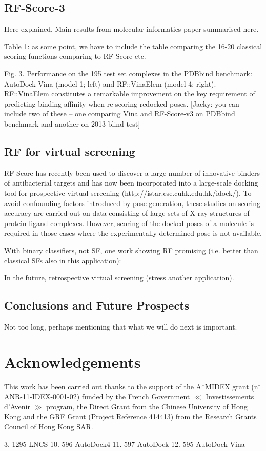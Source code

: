 \documentclass{llncs}
\begin{document}
\subsection{RF-Score-3}

Here explained. Main results from molecular informatics paper summarised here.

Table 1: as some point, we have to include the table comparing the 16-20 classical scoring functions comparing to RF-Score etc.

Fig. 3. Performance on the 195 test set complexes in the PDBbind benchmark: AutoDock Vina (model 1; left) and RF::VinaElem (model 4; right). RF::VinaElem constitutes a remarkable improvement on the key requirement of predicting binding affinity when re-scoring redocked poses. [Jacky: you can include two of these – one comparing Vina and RF-Score-v3 on PDBbind benchmark and another on 2013 blind test]

\subsection{RF for virtual screening}

RF-Score has recently been used \cite{1281} to discover a large number of innovative binders of antibacterial targets and has now been incorporated \cite{1362} into a large-scale docking tool for prospective virtual screening (http://istar.cse.cuhk.edu.hk/idock/). To avoid confounding factors introduced by pose generation, these studies on scoring accuracy are carried out on data consisting of large sets of X-ray structures of protein-ligand complexes. However, scoring of the docked poses of a molecule is required in those cases where the experimentally-determined pose is not available.

With binary classifiers, not SF, one work showing RF promising (i.e. better than classical SFs also in this application): \cite{1632}

In the future, retrospective virtual screening (stress another application).

\subsection{Conclusions and Future Prospects}

Not too long, perhaps mentioning that what we will do next is important.

\section{Acknowledgements}

This work has been carried out thanks to the support of the A*MIDEX grant (n$^\circ$ ANR-11-IDEX-0001-02) funded by the French Government $\ll$ Investissements d'Avenir $\gg$ program, the Direct Grant from the Chinese University of Hong Kong and the GRF Grant (Project Reference 414413) from the Research Grants Council of Hong Kong SAR.

3.	1295 LNCS
10.	596 AutoDock4
11.	597 AutoDock
12.	595 AutoDock Vina



\end{document}

